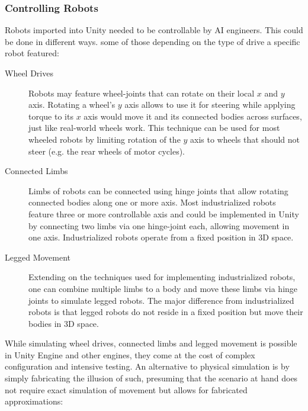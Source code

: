 \subsubsection{Controlling Robots}
Robots imported into Unity needed to be controllable by \ac{AI} engineers. This could be done in different ways. some of those depending on the type of drive a specific robot featured:
\begin{description}
    \item [Wheel Drives] Robots may feature wheel-joints that can rotate on their local $x$ and $y$ axis. Rotating a wheel's $y$ axis allows to use it for steering while applying torque to its $x$ axis would move it and its connected bodies across surfaces, just like real-world wheels work. This technique can be used for most wheeled robots by limiting rotation of the $y$ axis to wheels that should not steer (e.g. the rear wheels of motor cycles).
    \item [Connected Limbs] Limbs of robots can be connected using hinge joints that allow rotating connected bodies along one or more axis. Most industrialized robots feature three or more controllable axis and could be implemented in Unity by connecting two limbs via one hinge-joint each, allowing movement in one axis. Industrialized robots operate from a fixed position in 3D space.
    \item [Legged Movement] Extending on the techniques used for implementing industrialized robots, one can combine multiple limbs to a body and move these limbs via hinge joints to simulate legged robots. The major difference from industrialized robots is that legged robots do not reside in a fixed position but move their bodies in 3D space.
\end{description}
While simulating wheel drives, connected limbs and legged movement is possible in Unity Engine and other engines, they come at the cost of complex configuration and intensive testing. An alternative to physical simulation is by simply fabricating the illusion of such, presuming that the scenario at hand does not require exact simulation of movement but allows for fabricated approximations:
